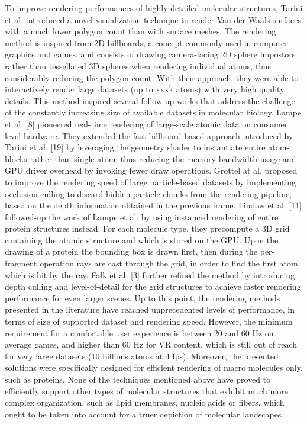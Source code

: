 To improve rendering performances of highly detailed molecular structures, Tarini et al. introduced a novel visualization technique to render Van der Waals surfaces with a much lower polygon count than with surface meshes.
The rendering method is inspired from 2D billboards, a concept commonly used in computer graphics and games, and consists of drawing camera-facing 2D sphere impostors rather than tessellated 3D spheres when rendering individual atoms, thus considerably reducing the polygon count.
With their approach, they were able to interactively render large datasets (up to xxxk atoms) with very high quality details.
This method inspired several follow-up works that address the challenge of the constantly increasing size of available datasets in molecular biology.
Lampe et al. [8] pioneered real-time rendering of large-scale atomic data on consumer level hardware. 
They extended the fast billboard-based approach introduced by Tarini et al. [19] by leveraging the geometry shader to instantiate entire atom-blocks rather than single atom, thus reducing the memory bandwidth usage and GPU driver overhead by invoking fewer draw operations. 
Grottel at al. proposed to improve the rendering speed of large particle-based datasets by implementing occlusion culling to discard hidden particle chunks from the rendering pipeline, based on the depth information obtained in the previous frame.
Lindow et al. [11] followed-up the work of Lampe et al. by using instanced rendering of entire protein structures instead. 
For each molecule type, they precompute a 3D grid containing the atomic structure and which is stored on the GPU.
Upon the drawing of a protein the bounding box is drawn first, then during the per-fragment operation rays are cast through the grid, in order to find the first atom which is hit by the ray.
Falk et al. [3] further refined the method by introducing depth culling and level-of-detail for the grid structures to achieve faster rendering performance for even larger scenes.
Up to this point, the rendering methods presented in the literature have reached unprecedented levels of performance, in terms of size of supported dataset and rendering speed.
However, the minimum requirement for a comfortable user experience is between 20 and 60 Hz on average games, and higher than 60 Hz for VR content, which is still out of reach for very large datasets (10 billions atoms at 4 fps).
Moreover, the presented solutions were specifically designed for efficient rendering of macro molecules only, such as proteins.
None of the techniques mentioned above have proved to efficiently support other types of molecular structures that exhibit much more complex organization, such as lipid membranes, nucleic acids or fibers, which ought to be taken into account for a truer depiction of molecular landscapes.
